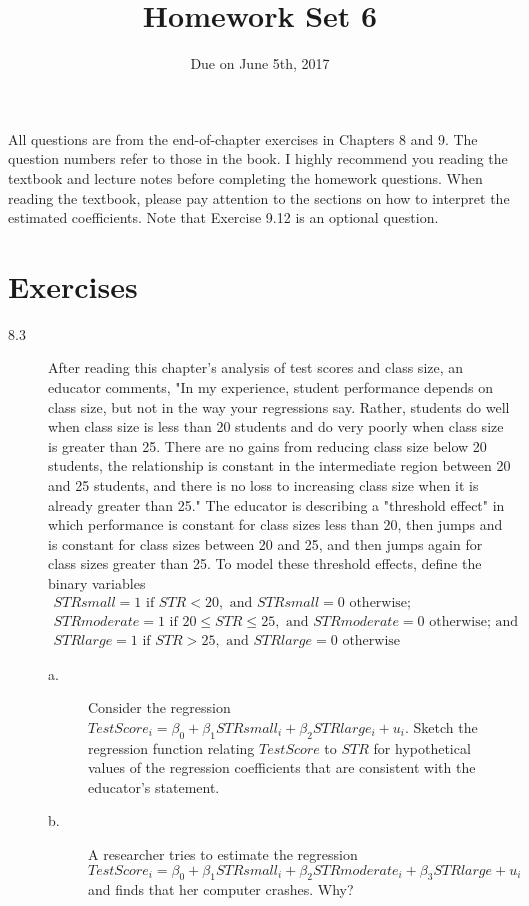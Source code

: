 \documentclass[a4paper,11pt]{article}
\date{Due on June 5th, 2017}
\title{Homework Set 6}
\begin{document}
\maketitle
All questions are from the end-of-chapter exercises in Chapters 8
and 9. The question numbers refer to those in the book. I highly
recommend you reading the textbook and lecture notes before completing
the homework questions. When reading the textbook, please pay
attention to the sections on how to interpret the estimated
coefficients. Note that Exercise 9.12 is an optional question.

\section*{Exercises}
\label{sec:org894de45}
\begin{description}
\item[{8.3}] After reading this chapter's analysis of test scores and class
size, an educator comments, "In my experience, student
performance depends on class size, but not in the way your
regressions say. Rather, students do well when class size is
less than 20 students and do very poorly when class size is
greater than 25. There are no gains from reducing class size
below 20 students, the relationship is constant in the
intermediate region between 20 and 25 students, and there is
no loss to increasing class size when it is already greater
than 25." The educator is describing a "threshold effect" in
which performance is constant for class sizes less than 20,
then jumps and is constant for class sizes between 20 and 25,
and then jumps again for class sizes greater than 25. To
model these threshold effects, define the binary variables
\begin{gather*}
STRsmall = 1 \text{ if } STR < 20, \text{ and } STRsmall =
0 \text{ otherwise;} \\
STRmoderate = 1 \text{ if } 20 \leq STR \leq 25, \text{ and } STRmoderate = 0 \text{ otherwise; and } \\
STRlarge = 1 \text{ if } STR > 25, \text{ and } STRlarge = 0 \text{ otherwise}
\end{gather*}
\begin{description}
\item[{a.}] Consider the regression \(TestScore_i = \beta_0 + \beta_1
          STRsmall_i + \beta_2 STRlarge_i + u_i\). Sketch the regression
function relating \(TestScore\) to \(STR\) for hypothetical values
of the regression coefficients that are consistent with the
educator's statement.
\item[{b.}] A researcher tries to estimate the regression \(TestScore_i = \beta_0 + \beta_1
          STRsmall_i + \beta_2 STRmoderate_i + \beta_3 STRlarge + u_i\)
and finds that her computer crashes. Why?
\end{description}


\end{description}
\end{document}
